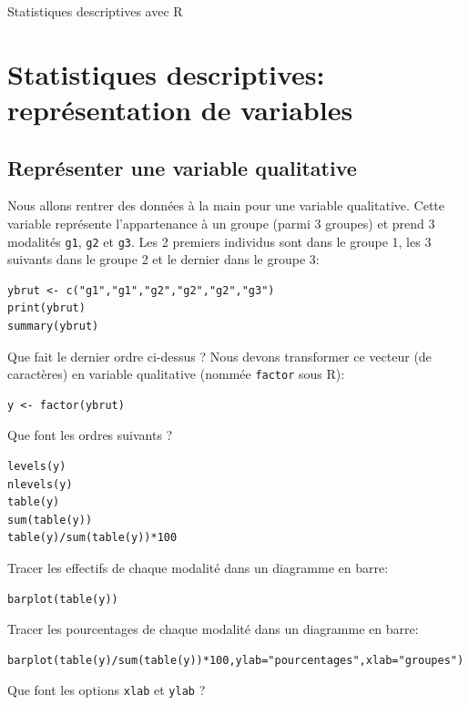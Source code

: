 \documentclass[a4paper,10pt,french]{article}
\begin{document}
\thispagestyle{empty}

\hspace*{-0.5cm}

\begin{center}
\LARGE Statistiques descriptives avec \textsf{R}
\end{center}
\bigskip

\section{Statistiques descriptives: représentation de variables}
\subsection{Représenter une variable qualitative}
Nous allons rentrer des données \og à la main\fg{} pour une variable
qualitative. Cette variable représente l'appartenance à un groupe
(parmi 3 groupes) et prend 3 modalités \texttt{g1}, \texttt{g2} et
\texttt{g3}. Les 2 premiers individus sont dans le groupe 1, les 3 suivants dans le groupe 2  et le dernier dans le groupe 3:
\begin{verbatim}
ybrut <- c("g1","g1","g2","g2","g2","g3")
print(ybrut)
summary(ybrut)
\end{verbatim}
Que fait le dernier ordre ci-dessus ?  Nous devons
transformer ce vecteur (de caractères) en variable qualitative (nommée
\texttt{factor} sous \textsf{R}):
\begin{verbatim}
y <- factor(ybrut)
\end{verbatim}
Que font les ordres suivants ?
\begin{verbatim}
levels(y)
nlevels(y)
table(y)
sum(table(y))
table(y)/sum(table(y))*100
\end{verbatim}
Tracer les effectifs de chaque modalité dans un diagramme en barre:
\begin{verbatim}
barplot(table(y))
\end{verbatim}
Tracer les pourcentages de chaque modalité dans un diagramme en barre:
\begin{verbatim}
barplot(table(y)/sum(table(y))*100,ylab="pourcentages",xlab="groupes")
\end{verbatim}
Que font les options \texttt{xlab} et \texttt{ylab} ?
\end{document}
